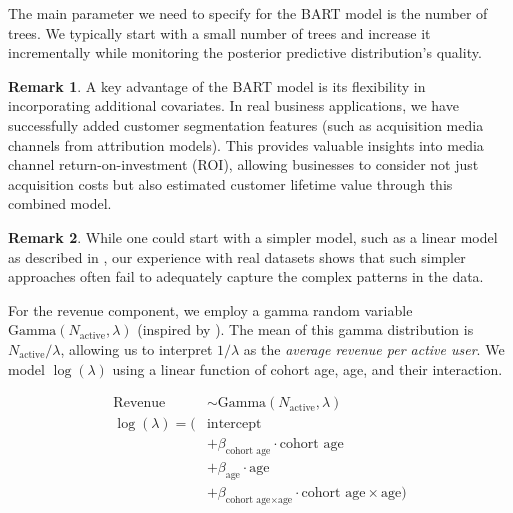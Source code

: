 \documentclass[11pt]{amsart}
\theoremstyle{definition}
\newtheorem{remark}{Remark}
\begin{document}
The main parameter we need to specify for the BART model is the number of trees. We typically start with a small number of
trees and increase it incrementally while monitoring the posterior predictive distribution's quality.

\begin{remark}
    A key advantage of the BART model is its flexibility in incorporating additional covariates. In real business
    applications, we have successfully added customer segmentation features (such as acquisition media channels from
    attribution models). This provides valuable insights into media channel return-on-investment (ROI), allowing businesses
    to consider not just acquisition costs but also estimated customer lifetime value through this combined model.
\end{remark}

\begin{remark}
    While one could start with a simpler model, such as a linear model as described in \cite{orduz_revenue_retention},
    our experience with real datasets shows that such simpler approaches often fail to adequately capture the complex
    patterns in the data.
\end{remark}

For the revenue component, we employ a gamma random variable $\text{Gamma}(N_{\text{active}}, \lambda)$ (inspired by
\cite{stucchio2015bayesian}). The mean of this gamma distribution is $N_{\text{active}} / \lambda$, allowing us to interpret
$1 / \lambda$ as the {\em average revenue per active user}. We model $\log(\lambda)$ using a linear function of cohort age,
age, and their interaction.

\begin{align*}
    \text{Revenue}    & \sim \text{Gamma}(N_{\text{active}}, \lambda)                                            \\
    \log(\lambda) = ( & \text{intercept}                                                                         \\
                      & + \beta_{\text{cohort age}} \cdot \text{cohort age}                                      \\
                      & + \beta_{\text{age}} \cdot \text{age}                                                    \\
                      & + \beta_{\text{cohort age} \times \text{age}} \cdot \text{cohort age} \times \text{age})
\end{align*}
\end{document}
